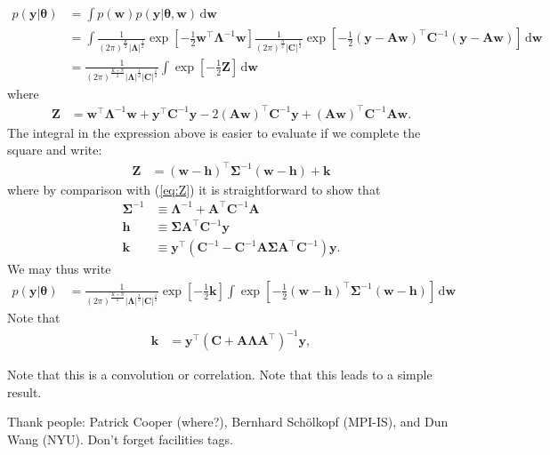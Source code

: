 \documentclass[modern]{rnaastex}
\newcommand{\dd}{\ensuremath{\,\mathrm{d}}}
\newcommand{\bvec}[1]{{\ensuremath{\boldsymbol{#1}}}}
\newcommand{\Gaussian}[3]{\ensuremath{\frac{1}{(2\pi)^\frac{#3}{2}|#2|^\frac{1}{2}} 
            \exp\left[ -\frac{1}{2}#1^\top #2^{-1} #1 \right]}}
\begin{document}
\begin{align}
\label{eq:integral}
p(\bvec{y} | \bvec{\theta}) &= 
    \int p(\bvec{w}) p(\bvec{y} | \bvec{\theta}, \bvec{w}) \dd\bvec{w} 
    \nonumber \\
%
&= \int \Gaussian{\bvec{w}}{\bvec{\Lambda}}{K} 
        \Gaussian{(\bvec{y} - \bvec{A}\bvec{w})}{\bvec{C}}{N} 
        \dd\bvec{w} \nonumber \\
%
&= \frac{1}{(2\pi)^\frac{K+N}{2}
        |\bvec{\Lambda}|^\frac{1}{2}
        |\bvec{C}|^\frac{1}{2}} 
   \int \exp\left[ -\frac{1}{2} \bvec{Z} \right] \dd\bvec{w}
\end{align}
%
where
%
\begin{align}
\label{eq:Z}
\bvec{Z} &= \bvec{w}^\top\bvec{\Lambda}^{-1}\bvec{w} + 
            \bvec{y}^\top\bvec{C}^{-1}\bvec{y} -
            2(\bvec{A}\bvec{w})^\top \bvec{C}^{-1} \bvec{y} +
            (\bvec{A}\bvec{w})^\top \bvec{C}^{-1} \bvec{A}\bvec{w}.
\end{align}
%
The integral in the expression above is easier to evaluate if we 
complete the square and write:
%
\begin{align}
\label{eq:Z_square}
\bvec{Z} &= (\bvec{w} - \bvec{h})^\top \bvec{\Sigma}^{-1} 
            (\bvec{w} - \bvec{h}) + \bvec{k}
\end{align}
%
where by comparison with (\ref{eq:Z}) it is straightforward to show that
%
\begin{align}
\bvec{\Sigma}^{-1} &\equiv \bvec{\Lambda}^{-1} + 
                           \bvec{A}^\top \bvec{C}^{-1} \bvec{A} \\
%
\bvec{h} &\equiv \bvec{\Sigma}\bvec{A}^\top \bvec{C}^{-1} \bvec{y} \\
%
\bvec{k} &\equiv \bvec{y}^\top 
            \left( 
            \bvec{C}^{-1} - 
            \bvec{C}^{-1} \bvec{A} \bvec{\Sigma} \bvec{A}^\top \bvec{C}^{-1}
            \right) \bvec{y}.
\end{align}
We may thus write
%
\begin{align}
p(\bvec{y} | \bvec{\theta}) &= 
        \frac{1}{(2\pi)^\frac{K+N}{2}
        |\bvec{\Lambda}|^\frac{1}{2}
        |\bvec{C}|^\frac{1}{2}} 
    \exp
    \left[
        -\frac{1}{2} 
        \bvec{k}
    \right]
   \int \exp
        \left[ 
            -\frac{1}{2} 
            (\bvec{w} - \bvec{h})^\top \bvec{\Sigma}^{-1} (\bvec{w} - \bvec{h})
        \right]
     \dd\bvec{w}
\end{align}
%
%
%
Note that
\begin{align}
\bvec{k} &= \bvec{y}^\top 
            \left( 
            \bvec{C} + \bvec{A}\bvec{\Lambda}\bvec{A}^\top
            \right)^{-1} 
            \bvec{y},
\end{align}

Note that this is a convolution or correlation. Note that this leads to a simple result.

\acknowledgements
Thank people:
  Patrick Cooper (where?),
  Bernhard Sch\"olkopf (MPI-IS), and
  Dun Wang (NYU).
Don't forget facilities tags.


\end{document}
